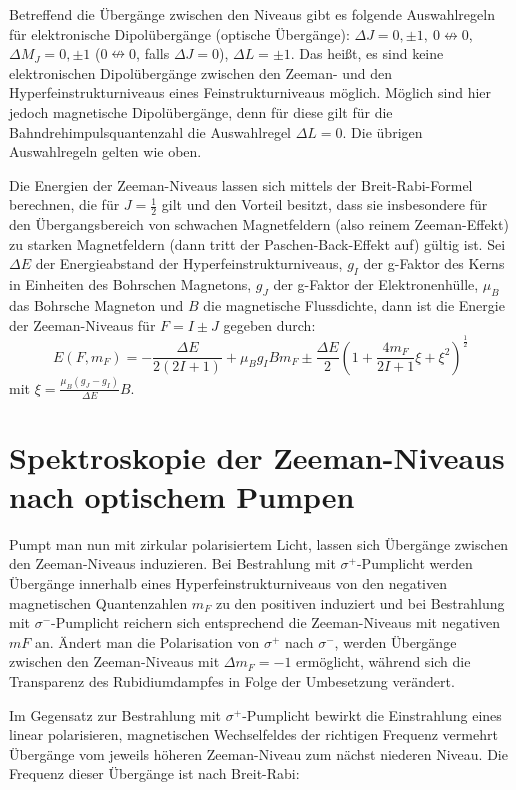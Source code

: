 \documentclass[bigchapter,colorback,accentcolor=tud4b,linedtoc,11pt]{tudreport}
\begin{document}
Betreffend die Übergänge zwischen den Niveaus gibt es folgende Auswahlregeln für elektronische Dipolübergänge (optische Übergänge): $\Delta J = 0, \pm 1,~ 0 \nleftrightarrow 0$, 
$\Delta M_J = 0, \pm 1$ ($ 0\nleftrightarrow 0 $, falls $\Delta J = 0$),
$\Delta L = \pm 1$.
Das heißt, es sind keine elektronischen Dipolübergänge zwischen den Zeeman- und den Hyperfeinstrukturniveaus eines Feinstrukturniveaus möglich. Möglich sind hier jedoch magnetische Dipolübergänge, denn für diese gilt für die Bahndrehimpulsquantenzahl die Auswahlregel $\Delta L = 0$. Die übrigen Auswahlregeln gelten wie oben.

Die Energien der Zeeman-Niveaus lassen sich mittels der Breit-Rabi-Formel berechnen, die für $J = \frac{1}{2}$ gilt und den Vorteil besitzt, dass sie insbesondere für den Übergangsbereich von schwachen Magnetfeldern (also reinem Zeeman-Effekt) zu starken Magnetfeldern (dann tritt der Paschen-Back-Effekt auf) gültig ist. Sei $\Delta E$ der Energieabstand der Hyperfeinstrukturniveaus, $g_I$ der g-Faktor des Kerns in Einheiten des Bohrschen Magnetons, $g_J$ der g-Faktor der Elektronenhülle, $\mu_B$ das Bohrsche Magneton und $B$ die magnetische Flussdichte, dann ist die Energie der Zeeman-Niveaus für $F = I \pm J$ gegeben durch:
$$E(F,m_F) = - \frac{\Delta E}{2 (2I + 1)} + \mu_B g_I B m_F \pm \frac{\Delta E}{2} ( 1 + \frac{4 m_F}{2I+1} \xi + \xi^2 )^{\frac{1}{2}}$$
mit $\xi = \frac{\mu_B (g_J - g_I)}{\Delta E} B.$

\section{Spektroskopie der Zeeman-Niveaus nach optischem Pumpen}

Pumpt man nun mit zirkular polarisiertem Licht, lassen sich Übergänge zwischen den Zeeman-Niveaus induzieren. Bei Bestrahlung mit $\sigma^+$-Pumplicht werden Übergänge innerhalb eines Hyperfeinstrukturniveaus von den negativen magnetischen Quantenzahlen $m_F$ zu den positiven induziert und bei Bestrahlung mit $\sigma^-$-Pumplicht reichern sich entsprechend die Zeeman-Niveaus mit negativen $mF$ an. Ändert man die Polarisation von $\sigma^+$ nach $\sigma^-$, werden Übergänge zwischen den Zeeman-Niveaus mit $\Delta m_F = -1$ ermöglicht, während sich die Transparenz des Rubidiumdampfes in Folge der Umbesetzung verändert.

Im Gegensatz zur Bestrahlung mit $\sigma^+$-Pumplicht bewirkt die Einstrahlung eines linear polarisieren, magnetischen Wechselfeldes der richtigen Frequenz vermehrt Übergänge vom jeweils höheren Zeeman-Niveau zum nächst niederen Niveau. Die Frequenz dieser Übergänge ist nach Breit-Rabi: 
\end{document}

